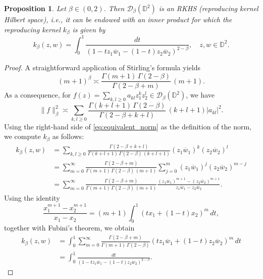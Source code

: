 \documentclass[a4paper,12pt]{amsart}
\newtheorem{prop}[thm]{Proposition}
\theoremstyle{definition}
\begin{document}
\begin{prop} \label{prop: kernel}
Let $\beta \in (0,2)$. Then $\mathcal D_\beta(\mathbb{D}^2)$ is an RKHS (reproducing kernel Hilbert space), i.e., it can be endowed with an inner product for which the reproducing kernel $k_\beta$ is given by
\begin{equation*}
    k_{\beta}(z,w) = \int_0^1 \frac{dt}{\left(1 - t z_1 \overline{w}_1 - (1-t) z_2 \overline{w}_2 \right)^{2-\beta}}, 
    \quad z,w \in \mathbb{D}^2.
\end{equation*}
\end{prop}
\begin{proof}
    A straightforward application of Stirling's formula yields
\begin{equation*}
    (m+1)^{\beta} \asymp \frac{\Gamma(m+1)\,\Gamma(2-\beta)}{\Gamma(2-\beta + m)} \, (m+1).
\end{equation*}
As a consequence, for $f(z) = \sum_{k,l \ge 0} a_{kl} z_1^k z_2^l \in \mathcal D_\beta(\mathbb{D}^2)$, we have
\begin{equation} \label{eq:equivalent_norm}
    \| f \|_\beta^2 \asymp \sum_{k,l \ge 0} 
    \frac{\Gamma(k+l+1)\,\Gamma(2-\beta)}{\Gamma(2-\beta + k + l)} \, (k+l+1) |a_{kl}|^2.
\end{equation}
Using the right-hand side of \eqref{eq:equivalent_norm} as the definition of the norm, we compute $k_\beta$ as follows:
\begin{equation*}
\begin{aligned}
k_{\beta}(z,w)
&= \sum_{k,l \ge 0} 
\frac{\Gamma(2-\beta + k + l)}{\Gamma(k+l+1)\,\Gamma(2-\beta)\,(k+l+1)} 
(z_1 \overline{w}_1)^{k} (z_2 \overline{w}_2)^{l} \\
&= \sum_{m=0}^{\infty} 
\frac{\Gamma(2-\beta + m)}{\Gamma(m+1)\,\Gamma(2-\beta)\,(m+1)} 
\sum_{j=0}^{m} (z_1 \overline{w}_1)^j (z_2 \overline{w}_2)^{m-j} \\
&= \sum_{m=0}^{\infty} 
\frac{\Gamma(2-\beta + m)}{\Gamma(m+1)\,\Gamma(2-\beta)\,(m+1)} 
\frac{(z_1 \overline{w}_1)^{m+1} - (z_2 \overline{w}_2)^{m+1}}
     {z_1 \overline{w}_1 - z_2 \overline{w}_2}.
\end{aligned}
\end{equation*}
Using the identity
\[
\frac{x_1^{m+1} - x_2^{m+1}}{x_1 - x_2}
= (m+1) \int_0^1 (t x_1 + (1-t) x_2)^m \, dt,
\]
together with Fubini's theorem, we obtain
\begin{equation*}
\begin{aligned}
k_{\beta}(z,w)
&= \int_0^1 \sum_{m=0}^{\infty} 
\frac{\Gamma(2-\beta + m)}{\Gamma(m+1)\,\Gamma(2-\beta)} 
\left( t z_1 \overline{w}_1 + (1-t) z_2 \overline{w}_2 \right)^m \, dt \\
&= \int_0^1 
\frac{dt}{\left(1 - t z_1 \overline{w}_1 - (1-t) z_2 \overline{w}_2 \right)^{2-\beta}}.
\end{aligned}
\end{equation*}
\end{proof}
\end{document}
